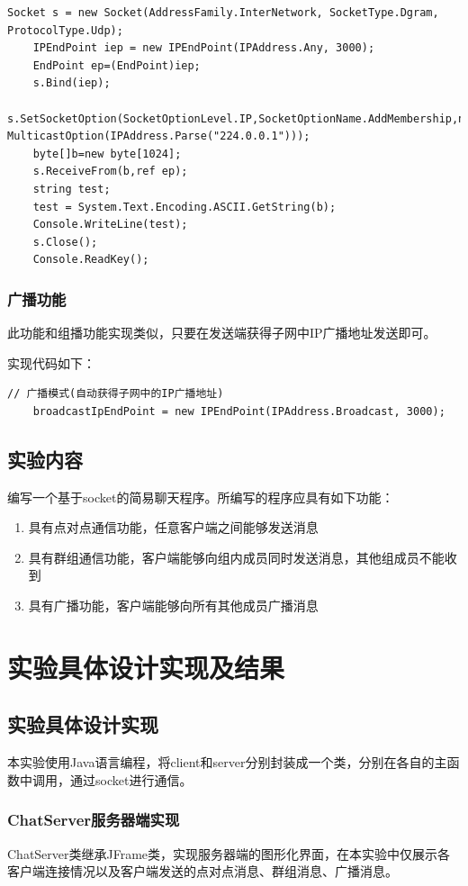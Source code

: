 \documentclass[UTF8,12pt]{article}
\begin{document}
\begin{lstlisting}[title=接收端,frame=shadowbox]
    Socket s = new Socket(AddressFamily.InterNetwork, SocketType.Dgram, ProtocolType.Udp);
    IPEndPoint iep = new IPEndPoint(IPAddress.Any, 3000);
    EndPoint ep=(EndPoint)iep;
    s.Bind(iep);
    s.SetSocketOption(SocketOptionLevel.IP,SocketOptionName.AddMembership,new   MulticastOption(IPAddress.Parse("224.0.0.1")));
    byte[]b=new byte[1024];
    s.ReceiveFrom(b,ref ep);
    string test;
    test = System.Text.Encoding.ASCII.GetString(b);
    Console.WriteLine(test);
    s.Close();
    Console.ReadKey();
\end{lstlisting}

\subsubsection{广播功能}
此功能和组播功能实现类似，只要在发送端获得子网中IP广播地址发送即可。

实现代码如下：
\begin{lstlisting}[title=广播,frame=shadowbox]
    // 广播模式(自动获得子网中的IP广播地址)
    broadcastIpEndPoint = new IPEndPoint(IPAddress.Broadcast, 3000);
\end{lstlisting}

\subsection{实验内容}
编写一个基于socket的简易聊天程序。所编写的程序应具有如下功能：
\begin{enumerate}
    \item 具有点对点通信功能，任意客户端之间能够发送消息
    \item 具有群组通信功能，客户端能够向组内成员同时发送消息，其他组成员不能收到
    \item 具有广播功能，客户端能够向所有其他成员广播消息
\end{enumerate}

\section{实验具体设计实现及结果}
\subsection{实验具体设计实现}
本实验使用Java语言编程，将client和server分别封装成一个类，分别在各自的主函数中调用，通过socket进行通信。

\subsubsection{ChatServer服务器端实现}
ChatServer类继承JFrame类，实现服务器端的图形化界面，在本实验中仅展示各客户端连接情况以及客户端发送的点对点消息、群组消息、广播消息。
\end{document}
